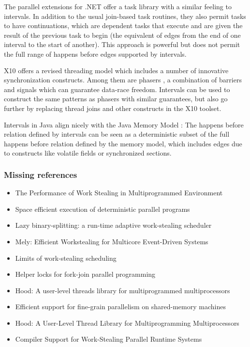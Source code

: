 The parallel extensions for .NET \cite{Leijen2009} offer a task
library with a similar feeling to intervals. In addition to the usual
join-based task routines, they also permit tasks to have
continuations, which are dependent tasks that execute and are given
the result of the previous task to begin (the equivalent of edges from
the end of one interval to the start of another). This approach is
powerful but does not permit the full range of happens before edges
supported by intervals.

X10 \cite{Charles2005, Saraswat2010} offers a revised threading model
which includes a number of innovative synchronization
constructs. Among them are phasers \cite{Shirako2008, Shirako2010}, a
combination of barriers and signals which can guarantee data-race
freedom. Intervals can be used to construct the same patterns as
phasers with similar guarantees, but also go further by replacing
thread joins and other constructs in the X10 toolset.

Intervals in Java align nicely with the Java Memory Model
\cite{Manson2005}: The happens before relation defined by intervals
can be seen as a deterministic subset of the full happens before
relation defined by the memory model, which includes edges due to
constructs like volatile fields or synchronized sections.


\subsubsection{Missing references}

\begin{itemize}
\item The Performance of Work Stealing in Multiprogrammed Environment
  \cite{Blumofe1998a}
\item Space efficient execution of deterministic parallel programs
  \cite{Simpson1999}
\item Lazy binary-splitting: a run-time adaptive work-stealing
  scheduler \cite{Tzannes2010}
\item Mely: Efficient Workstealing for Multicore Event-Driven Systems
  \cite{Gaud2010}
\item Limits of work-stealing scheduling \cite{Vrba2009}
\item Helper locks for fork-join parallel programming
  \cite{Agrawal2010}
\item Hood: A user-level threads library for multiprogrammed
  multiprocessors \cite{Blumofe1998}
\item Efficient support for fine-grain parallelism on shared-memory
  machines \cite{Lowenthal1998}
\item Hood: A User-Level Thread Library for Multiprogramming
  Multiprocessors \cite{Papadopoulos1998}
\item Compiler Support for Work-Stealing Parallel Runtime Systems
  \cite{Raman2009}
\end{itemize}


